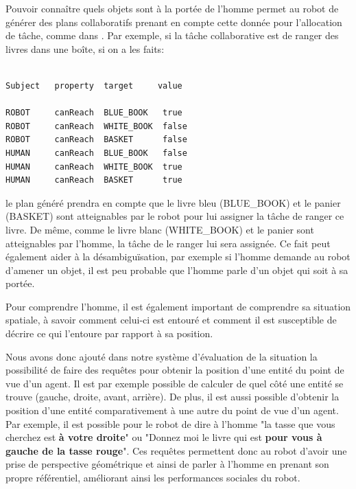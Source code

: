 \documentclass[a4paper,11pt,twoside]{StyleThese}
\begin{document}
Pouvoir connaître quels objets sont à la portée de l'homme permet au robot de générer des plans collaboratifs prenant en compte cette donnée pour l'allocation de tâche, comme dans \cite{gharbi2015}.
Par exemple, si la tâche collaborative est de ranger des livres dans une boîte, si on a les faits:

\begin{scriptsize}
\begin{verbatim}

Subject   property  target     value

ROBOT     canReach  BLUE_BOOK   true
ROBOT     canReach  WHITE_BOOK  false
ROBOT     canReach  BASKET      false
HUMAN     canReach  BLUE_BOOK   false
HUMAN     canReach  WHITE_BOOK  true
HUMAN     canReach  BASKET      true
\end{verbatim}
\end{scriptsize}

le plan généré prendra en compte que le livre bleu (BLUE\_BOOK) et le panier (BASKET) sont atteignables par le robot pour lui assigner la tâche de ranger ce livre. De même, comme le livre blanc (WHITE\_BOOK) et le panier sont atteignables par l'homme, la tâche de le ranger lui sera assignée.
Ce fait peut également aider à la désambiguïsation, par exemple si l'homme demande au robot d'amener un objet, il est peu probable que l'homme parle d'un objet qui soit à sa portée.

Pour comprendre l'homme, il est également important de comprendre sa situation spatiale, à savoir comment celui-ci est entouré et comment il est susceptible de décrire ce qui l'entoure par rapport à sa position.

Nous avons donc ajouté dans notre système d'évaluation de la situation la possibilité de faire des requêtes pour obtenir la position d'une entité du point de vue d'un agent. Il est par exemple possible de calculer de quel côté une entité se trouve (gauche, droite, avant, arrière).
De plus, il est aussi possible d'obtenir la position d'une entité comparativement à une autre du point de vue d'un agent. Par exemple, il est possible pour le robot de dire à l'homme "la tasse que vous cherchez est \textbf{à votre droite}" ou "Donnez moi le livre qui est \textbf{pour vous à gauche de la tasse rouge}".
Ces requêtes permettent donc au robot d'avoir une prise de perspective géométrique et ainsi de parler à l'homme en prenant son propre référentiel, améliorant ainsi les performances sociales du robot.
\end{document}
